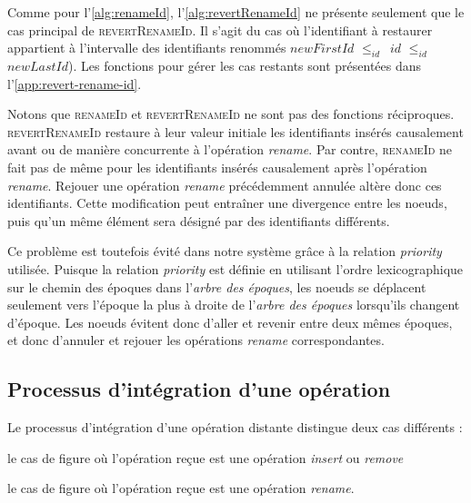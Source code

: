 \documentclass[12pt]{thesul}
\newcommand{\trm}[1]{\mathit{#1}}
\newcommand{\epoch}[1]{$\varepsilon_{#1}$}
\newcommand{\leqid}{$\leq_{id}$~}
\begin{document}

Comme pour l'\autoref{alg:renameId}, l'\autoref{alg:revertRenameId} ne présente seulement que le cas principal de \textsc{revertRenameId}.
Il s'agit du cas où l'identifiant à restaurer appartient à l'intervalle des identifiants renommés $\trm{newFirstId}$ \leqid $\trm{id}$ \leqid $\trm{newLastId}$).
Les fonctions pour gérer les cas restants sont présentées dans l'\autoref{app:revert-rename-id}.

Notons que \textsc{renameId} et \textsc{revertRenameId} ne sont pas des fonctions réciproques.
\textsc{revertRenameId} restaure à leur valeur initiale les identifiants insérés causalement avant ou de manière concurrente à l'opération \emph{rename}.
Par contre, \textsc{renameId} ne fait pas de même pour les identifiants insérés causalement après l'opération \emph{rename}.
Rejouer une opération \emph{rename} précédemment annulée altère donc ces identifiants.
Cette modification peut entraîner une divergence entre les noeuds, puis qu'un même élément sera désigné par des identifiants différents.

Ce problème est toutefois évité dans notre système grâce à la relation \emph{priority} utilisée.
Puisque la relation \emph{priority} est définie en utilisant l'ordre lexicographique sur le chemin des époques dans l'\emph{arbre des époques}, les noeuds se déplacent seulement vers l'époque la plus à droite de l'\emph{arbre des époques} lorsqu'ils changent d'époque.
Les noeuds évitent donc d'aller et revenir entre deux mêmes époques, et donc d'annuler et rejouer les opérations \emph{rename} correspondantes.

\subsection{Processus d'intégration d'une opération}

Le processus d'intégration d'une opération distante distingue deux cas différents :
\begin{enumerate*}[label=(\roman*)]
  \item le cas de figure où l'opération reçue est une opération \emph{insert} ou \emph{remove}
  \item le cas de figure où l'opération reçue est une opération \emph{rename}.
\end{enumerate*}
\end{document}
